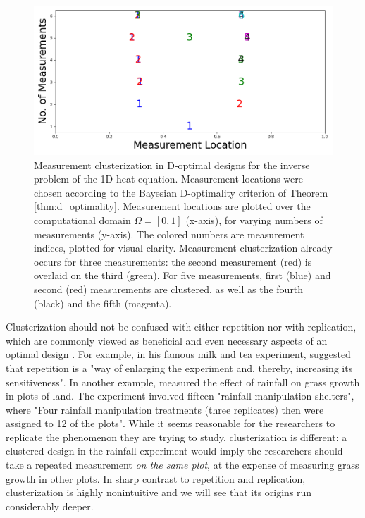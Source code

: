 \documentclass[ba]{imsart}
\theoremstyle{plain}
\theoremstyle{definition}
\theoremstyle{remark}
\begin{document}
\begin{figure}
    \centering
    \includegraphics[height=0.5\textwidth]{figs/dst_modelError0.png}
    \caption{Measurement clusterization in D-optimal designs for the
      inverse problem of the 1D heat equation. Measurement locations
      were chosen according to the Bayesian D-optimality criterion of
      Theorem \ref{thm:d_optimality}. Measurement locations are
      plotted over the computational domain \(\Omega = [0, 1]\)
      (x-axis), for varying numbers of measurements (y-axis). The
      colored numbers are measurement indices, plotted for visual
      clarity. Measurement clusterization already occurs for three
      measurements: the second measurement (red) is overlaid on the
      third (green). For five measurements, first (blue) and second
      (red) measurements are clustered, as well as the fourth (black)
      and the fifth (magenta).}
  \label{fig:clusterization_illustration}
\end{figure}


Clusterization should not be confused with either repetition nor with
replication, which are commonly viewed as beneficial and even
necessary aspects of an optimal design \cite{fisher1949design,
  morris2011, schafer2001replication}. For example,
\cite{fisher1949design} in his famous milk and tea experiment,
suggested that repetition is a "way of enlarging the experiment and,
thereby, increasing its sensitiveness". In another example,
\cite{fay2000rainfall} measured the effect of rainfall on grass growth
in plots of land. The experiment involved fifteen "rainfall
manipulation shelters", where "Four rainfall manipulation treatments
(three replicates) then were assigned to 12 of the plots". While it
seems reasonable for the researchers to replicate the phenomenon they
are trying to study, clusterization is different: a clustered design
in the rainfall experiment would imply the researchers should take a
repeated measurement \emph{on the same plot}, at the expense of
measuring grass growth in other plots. In sharp contrast to repetition
and replication, clusterization is highly nonintuitive and we will see
that its origins run considerably deeper.
\end{document}

